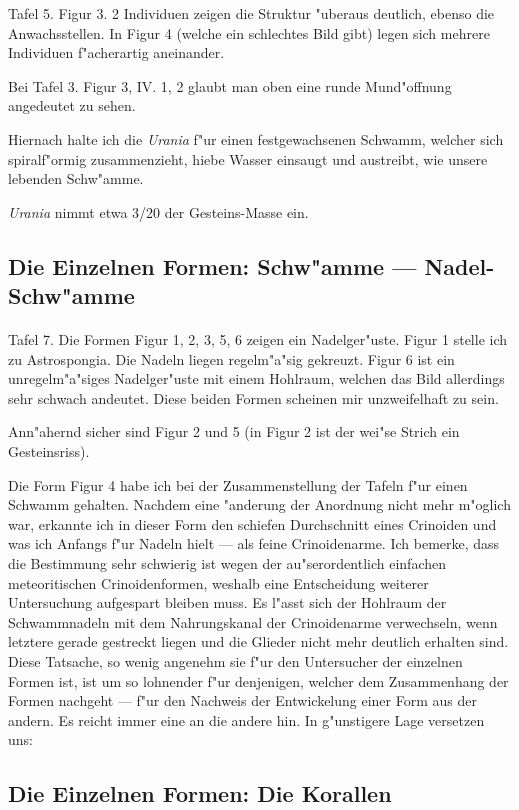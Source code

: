 \documentclass[a4paper, 11pt, oneside]{article}
\begin{document}
Tafel 5. Figur 3. 2 Individuen zeigen die Struktur "uberaus deutlich, ebenso die Anwachsstellen. In Figur 4 (welche ein schlechtes Bild gibt) legen sich mehrere Individuen f"acherartig aneinander.

Bei Tafel 3. Figur 3, IV. 1, 2 glaubt man oben eine runde Mund"offnung angedeutet zu sehen.

Hiernach halte ich die \emph{Urania} f"ur einen festgewachsenen Schwamm, welcher sich spiralf"ormig zusammenzieht, hiebe Wasser einsaugt und austreibt, wie unsere lebenden Schw"amme.

\emph{Urania} nimmt etwa 3/20 der Gesteins-Masse ein.
\clearpage
\subsection{Die Einzelnen Formen: Schw"amme --- Nadel-Schw"amme}
\paragraph{}
Tafel 7. Die Formen Figur 1, 2, 3, 5, 6 zeigen ein Nadelger"uste. Figur 1 stelle ich zu Astrospongia. Die Nadeln liegen regelm"a"sig gekreuzt. Figur 6 ist ein unregelm"a"siges Nadelger"uste mit einem Hohlraum, welchen das Bild allerdings sehr schwach andeutet. Diese beiden Formen scheinen mir unzweifelhaft zu sein.

Ann"ahernd sicher sind Figur 2 und 5 (in Figur 2 ist der wei"se Strich ein Gesteinsriss).

Die Form Figur 4 habe ich bei der Zusammenstellung der Tafeln f"ur einen Schwamm gehalten. Nachdem eine "anderung der Anordnung nicht mehr m"oglich war, erkannte ich in dieser Form den schiefen Durchschnitt eines Crinoiden und was ich Anfangs f"ur Nadeln hielt --- als feine Crinoidenarme. Ich bemerke, dass die Bestimmung sehr schwierig ist wegen der au"serordentlich einfachen meteoritischen Crinoidenformen, weshalb eine Entscheidung weiterer Untersuchung aufgespart bleiben muss. Es l"asst sich der Hohlraum der Schwammnadeln mit dem Nahrungskanal der Crinoidenarme verwechseln, wenn letztere gerade gestreckt liegen und die Glieder nicht mehr deutlich erhalten sind. Diese Tatsache, so wenig angenehm sie f"ur den Untersucher der einzelnen Formen ist, ist um so lohnender f"ur denjenigen, welcher dem Zusammenhang der Formen nachgeht --- f"ur den Nachweis der Entwickelung einer Form aus der andern. Es reicht immer eine an die andere hin. In g"unstigere Lage versetzen uns:
\clearpage
\subsection{Die Einzelnen Formen: Die Korallen}
\end{document}
